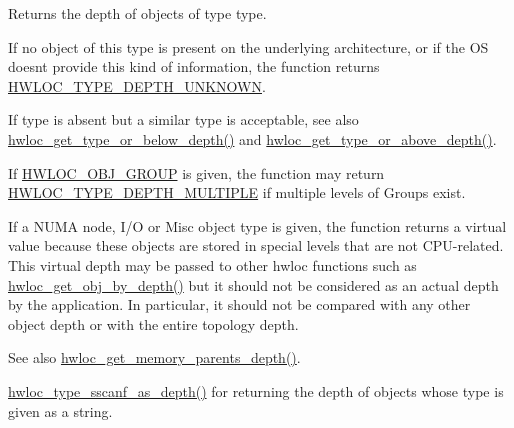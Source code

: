 Returns the depth of objects of type {\ttfamily type}. 

If no object of this type is present on the underlying architecture, or if the OS doesn\textquotesingle{}t provide this kind of information, the function returns \hyperlink{a00187_ggaf4e663cf42bbe20756b849c6293ef575a0565ab92ab72cb0cec91e23003294aad}{H\+W\+L\+O\+C\+\_\+\+T\+Y\+P\+E\+\_\+\+D\+E\+P\+T\+H\+\_\+\+U\+N\+K\+N\+O\+WN}.

If type is absent but a similar type is acceptable, see also \hyperlink{a00187_ga8125328e69eba709c33ea8055c12589b}{hwloc\+\_\+get\+\_\+type\+\_\+or\+\_\+below\+\_\+depth()} and \hyperlink{a00187_ga8a9ee573b7d2190272095d10712a7cca}{hwloc\+\_\+get\+\_\+type\+\_\+or\+\_\+above\+\_\+depth()}.

If \hyperlink{a00184_ggacd37bb612667dc437d66bfb175a8dc55a5269ef95be72f88465559d35c9b7ad56}{H\+W\+L\+O\+C\+\_\+\+O\+B\+J\+\_\+\+G\+R\+O\+UP} is given, the function may return \hyperlink{a00187_ggaf4e663cf42bbe20756b849c6293ef575ae99465995cacde6c210d5fc2e409798c}{H\+W\+L\+O\+C\+\_\+\+T\+Y\+P\+E\+\_\+\+D\+E\+P\+T\+H\+\_\+\+M\+U\+L\+T\+I\+P\+LE} if multiple levels of Groups exist.

If a N\+U\+MA node, I/O or Misc object type is given, the function returns a virtual value because these objects are stored in special levels that are not C\+P\+U-\/related. This virtual depth may be passed to other hwloc functions such as \hyperlink{a00187_ga391f6b2613f0065673eaa4069b93d4e0}{hwloc\+\_\+get\+\_\+obj\+\_\+by\+\_\+depth()} but it should not be considered as an actual depth by the application. In particular, it should not be compared with any other object depth or with the entire topology depth. \begin{DoxySeeAlso}{See also}
\hyperlink{a00187_gae85786340b88e24835f8c403a1e2e54b}{hwloc\+\_\+get\+\_\+memory\+\_\+parents\+\_\+depth()}.

\hyperlink{a00188_ga52c63cd7203e55b804c1314affc9bd12}{hwloc\+\_\+type\+\_\+sscanf\+\_\+as\+\_\+depth()} for returning the depth of objects whose type is given as a string. 
\end{DoxySeeAlso}
\mbox{\label{a00187_ga8a9ee573b7d2190272095d10712a7cca}} 
